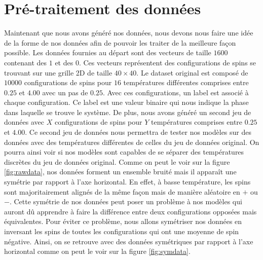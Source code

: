 \documentclass[11pt, parskip=half]{scrartcl} %
\begin{document}
\section{Pré-traitement des données}
Maintenant que nous avons généré nos données, nous devons nous faire une idée de la forme de nos données afin de pouvoir les traiter de la meilleure façon possible.
Les données fournies au départ sont des vecteurs de taille $1600$ contenant des $1$ et des $0$. Ces vecteurs représentent des configurations de spins se trouvant sur une grille 2D de taille $40 \times 40$. Le dataset original est composé de $10000$ configurations de spins pour $16$ températures différentes comprises entre $0.25$ et $4.00$ avec un pas de $0.25$.
Avec ces configurations, un label est associé à chaque configuration. Ce label est une valeur binaire qui nous indique la phase dans laquelle se trouve le système.
De plus, nous avons généré un second jeu de données avec $X$ configurations de spins pour $Y$ températures comprises entre $0.25$ et $4.00$. Ce second jeu de données nous permettra de tester nos modèles sur des données avec des températures différentes de celles du jeu de données original. On pourra ainsi voir si nos modèles sont capables de se séparer des températures discrètes du jeu de données original.
Comme on peut le voir sur la figure \ref{fig:rawdata}, nos données forment un ensemble bruité mais il apparaît une symétrie par rapport à l'axe horizontal. En effet, à basse température, les spins sont majoritairement alignés de la même façon mais de manière aléatoire en $+$ ou $-$.
Cette symétrie de nos données peut poser un problème à nos modèles qui auront dû apprendre à faire la différence entre deux configurations opposées mais équivalentes. Pour éviter ce problème, nous allons symétriser nos données en inversant les spins de toutes les configurations qui ont une moyenne de spin négative.
Ainsi, on se retrouve avec des données symétriques par rapport à l'axe horizontal comme on peut le voir sur la figure \ref{fig:symdata}.
\end{document}
